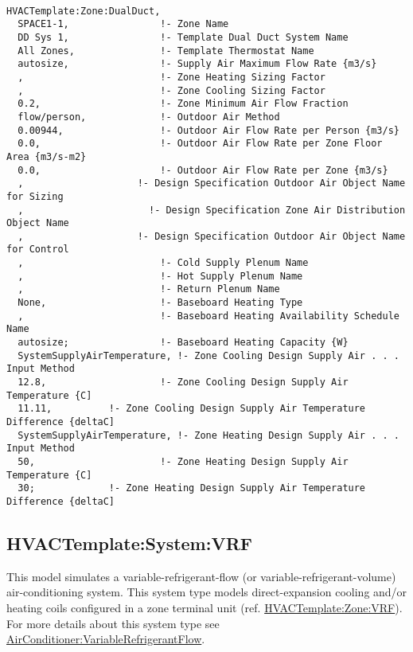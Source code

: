 \begin{lstlisting}

HVACTemplate:Zone:DualDuct,
  SPACE1-1,                !- Zone Name
  DD Sys 1,                !- Template Dual Duct System Name
  All Zones,               !- Template Thermostat Name
  autosize,                !- Supply Air Maximum Flow Rate {m3/s}
  ,                        !- Zone Heating Sizing Factor
  ,                        !- Zone Cooling Sizing Factor
  0.2,                     !- Zone Minimum Air Flow Fraction
  flow/person,             !- Outdoor Air Method
  0.00944,                 !- Outdoor Air Flow Rate per Person {m3/s}
  0.0,                     !- Outdoor Air Flow Rate per Zone Floor Area {m3/s-m2}
  0.0,                     !- Outdoor Air Flow Rate per Zone {m3/s}
  ,                    !- Design Specification Outdoor Air Object Name for Sizing
  ,                      !- Design Specification Zone Air Distribution Object Name
  ,                    !- Design Specification Outdoor Air Object Name for Control
  ,                        !- Cold Supply Plenum Name
  ,                        !- Hot Supply Plenum Name
  ,                        !- Return Plenum Name
  None,                    !- Baseboard Heating Type
  ,                        !- Baseboard Heating Availability Schedule Name
  autosize;                !- Baseboard Heating Capacity {W}
  SystemSupplyAirTemperature, !- Zone Cooling Design Supply Air . . . Input Method
  12.8,                    !- Zone Cooling Design Supply Air Temperature {C]
  11.11,          !- Zone Cooling Design Supply Air Temperature Difference {deltaC]
  SystemSupplyAirTemperature, !- Zone Heating Design Supply Air . . . Input Method
  50,                      !- Zone Heating Design Supply Air Temperature {C]
  30;             !- Zone Heating Design Supply Air Temperature Difference {deltaC]
\end{lstlisting}

\subsection{HVACTemplate:System:VRF}\label{hvactemplatesystemvrf}

This model simulates a variable-refrigerant-flow (or variable-refrigerant-volume) air-conditioning system. This system type models direct-expansion cooling and/or heating coils configured in a zone terminal unit (ref. \hyperref[hvactemplatezonevrf]{HVACTemplate:Zone:VRF}). For more details about this system type see \hyperref[airconditionervariablerefrigerantflow]{AirConditioner:VariableRefrigerantFlow}.

